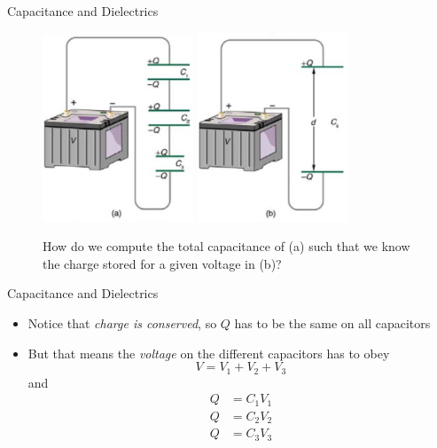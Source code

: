 \documentclass{beamer}
\begin{document}
\begin{frame}{Capacitance and Dielectrics}
\begin{figure}
\centering
\includegraphics[width=0.4\textwidth]{figures/cap1.png} \hspace{0.2cm}
\includegraphics[width=0.4\textwidth]{figures/cap2.png}
\caption{\label{fig:cap} How do we compute the total capacitance of (a) such that we know the charge stored for a given voltage in (b)?}
\end{figure}
\end{frame}

\begin{frame}{Capacitance and Dielectrics}
\begin{itemize}
\item Notice that \textit{charge is conserved}, so $Q$ has to be the same on all capacitors
\item But that means the \textit{voltage} on the different capacitors has to obey
\begin{equation}
V = V_1 + V_2 + V_3
\end{equation}
and
\begin{align}
Q &= C_1 V_1 \\
Q &= C_2 V_2 \\
Q &= C_3 V_3
\end{align}
\end{itemize}
\end{frame}
\end{document}
